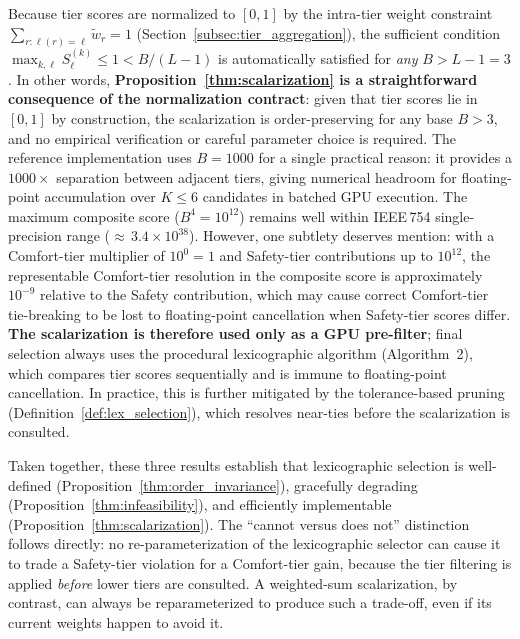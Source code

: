 \begin{remark}
\label{rem:B_choice}
Because tier scores are normalized to $[0,1]$ by the intra-tier weight constraint $\sum_{r:\ell(r)=\ell}\tilde{w}_r = 1$ (Section~\ref{subsec:tier_aggregation}), the sufficient condition $\max_{k,\ell} S_\ell^{(k)} \leq 1 < B/(L{-}1)$ is automatically satisfied for \emph{any} $B > L{-}1 = 3$.  In other words, \textbf{Proposition~\ref{thm:scalarization} is a straightforward consequence of the normalization contract}: given that tier scores lie in $[0,1]$ by construction, the scalarization is order-preserving for any base $B > 3$, and no empirical verification or careful parameter choice is required.  The reference implementation uses $B{=}1000$ for a single practical reason: it provides a $1000\times$ separation between adjacent tiers, giving numerical headroom for floating-point accumulation over $K \leq 6$ candidates in batched GPU execution.  The maximum composite score ($B^4 = 10^{12}$) remains well within IEEE\,754 single-precision range (${\approx}\,3.4\times10^{38}$).  However, one subtlety deserves mention: with a Comfort-tier multiplier of $10^0{=}1$ and Safety-tier contributions up to $10^{12}$, the representable Comfort-tier resolution in the composite score is approximately $10^{-9}$ relative to the Safety contribution, which may cause correct Comfort-tier tie-breaking to be lost to floating-point cancellation when Safety-tier scores differ.  \textbf{The scalarization is therefore used only as a GPU pre-filter}; final selection always uses the procedural lexicographic algorithm (Algorithm~2), which compares tier scores sequentially and is immune to floating-point cancellation.  In practice, this is further mitigated by the tolerance-based pruning (Definition~\ref{def:lex_selection}), which resolves near-ties before the scalarization is consulted.
\end{remark}

\noindent
Taken together, these three results establish that lexicographic selection is well-defined (Proposition~\ref{thm:order_invariance}), gracefully degrading (Proposition~\ref{thm:infeasibility}), and efficiently implementable (Proposition~\ref{thm:scalarization}).  The ``cannot versus does not'' distinction follows directly: no re-parameterization of the lexicographic selector can cause it to trade a Safety-tier violation for a Comfort-tier gain, because the tier filtering is applied \emph{before} lower tiers are consulted.  A weighted-sum scalarization, by contrast, can always be reparameterized to produce such a trade-off, even if its current weights happen to avoid it.

